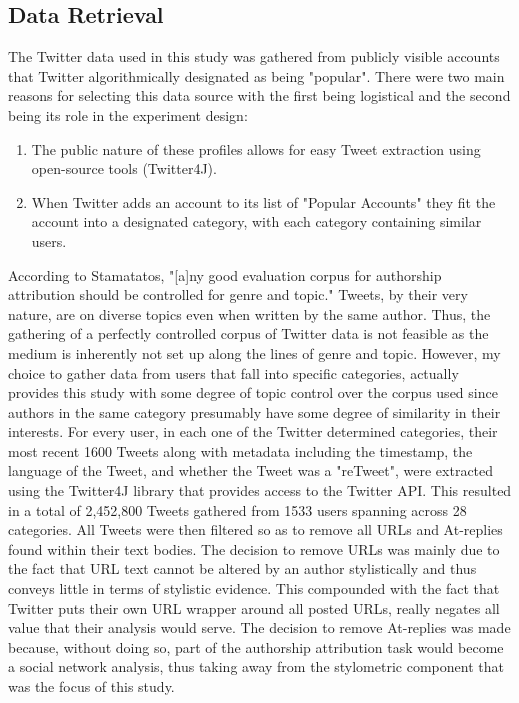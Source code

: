 \documentclass[pageno]{jpaper}
\begin{document}
\subsection{Data Retrieval}
\label{dataRetrieval}
The Twitter data used in this study was gathered from publicly visible accounts that Twitter algorithmically designated as being "popular".  There were two main reasons for selecting this data source with the first being logistical and the second being its role in the experiment design: 
\begin{enumerate}
\item{The public nature of these profiles allows for easy Tweet extraction using open-source tools (Twitter4J).}
\item{When Twitter adds an account to its list of "Popular Accounts" they fit the account into a designated category, with each category containing similar users.}
\end{enumerate}
According to Stamatatos, "[a]ny good evaluation corpus for authorship attribution should be controlled for genre and topic."\cite{survey}
Tweets, by their very nature, are on diverse topics even when written by the same author.  Thus, the gathering of a perfectly controlled corpus of Twitter data is not feasible as the medium is inherently not set up along the lines of genre and topic.  However, my choice to gather data from users that fall into specific categories, actually provides this study with some degree of topic control over the corpus used since authors in the same category presumably have some degree of similarity in their interests.
For every user, in each one of the Twitter determined categories, their most recent 1600 Tweets along with metadata including the timestamp, the language of the Tweet, and whether the Tweet was a "reTweet", were extracted using the Twitter4J \cite{twitter4j} library that provides access to the Twitter API.  This resulted in a total of 2,452,800 Tweets gathered from 1533 users spanning across 28 categories.  All Tweets were then filtered so as to remove all URLs and At-replies found within their text bodies.  The decision to remove URLs was mainly due to the fact that URL text cannot be altered by an author stylistically and thus conveys little in terms of stylistic evidence.  This compounded with the fact that Twitter puts their own URL wrapper around all posted URLs, really negates all value that their analysis would serve.  The decision to remove At-replies was made because, without doing so, part of the authorship attribution task would become a social network analysis, thus taking away from the stylometric component that was the focus of this study.
\end{document}

